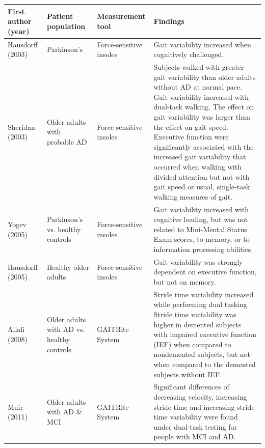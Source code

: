 \documentclass[11pt, oneside]{report}
\begin{document}
\begin{table}[!htb]

\begin{adjustbox}{max width=\textwidth}
  \begin{tabular}{| l | p{4cm} | p{4cm} | p{7cm} |}

    \hline
    \textbf{First author (year)} & \textbf{Patient population} & \textbf{Measurement tool} & \textbf{Findings} \\ \hline
    
    Hausdorff (2003)\cite{Hausdorff2003} & Parkinson's & Force-sensitive insoles & Gait variability increased when cognitively challenged. \\ \hline
    
    Sheridan (2003)\cite{Sheridan2003} & Older adults with probable AD & Force-sensitive insoles  & Subjects walked with greater gait variability than older adults without AD at normal pace. Gait variability increased with dual-task walking. The effect on gait variability was larger than the effect on gait speed. Executive function were significantly associated with the increased gait variability that occurred when walking with divided attention but not with gait speed or usual, single-task walking measures of gait. \\ \hline
    
    Yogev (2005)\cite{Yogev2005} & Parkinson's vs. healthy controls & Force-sensitive insoles & Gait variability increased with cognitive loading, but was not related to Mini-Mental Status Exam scores, to memory, or to information processing abilities. \\ \hline
    
    Hausdorff (2005)\cite{Hausdorff2005b} & Healthy older adults & Force-sensitive insoles & Gait variability was strongly dependent on executive function, but not on memory. \\ \hline
    
        Allali (2008)\cite{Allali2008} & Older adults with AD vs. healthy controls & GAITRite System & Stride time variability increased while performing dual tasking. Stride time variability was higher in demented subjects with impaired executive function (IEF) when compared to nondemented subjects, but not when compared to the demented subjects without IEF. \\ \hline
        
    Muir (2011)\cite{Muir2012a} & Older adults with AD \& MCI & GAITRite System & Significant differences of decreasing velocity, increasing stride time and increasing stride time variability were found under dual-task testing for people with MCI and AD. \\ \hline
    

\end{tabular}
\end{adjustbox}
\end{table}
\end{document}
